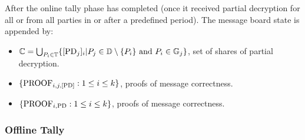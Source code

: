 \documentclass{article}
\begin{document}
After the online tally phase has completed (once it received partial decryption for all \SetOfEncryptedPartialDecryptionKeys{} or from all parties in \SetOfFDKG{} or after a predefined period). The message board state is appended by:
\begin{itemize}
    \item $\mathbb{C} = \bigcup_{P_i \in \mathbb{T}} \{ [\mathrm{PD}_{j}]_{i} | P_{j} \in \mathbb{D} \setminus \{P_{i}\} \text{ and } P_{i} \in \mathbb{G}_{j}\}$, set of shares of partial decryption.
    \item $\{\textrm{PROOF}_{i,j,\textrm{[PD]}} : 1 \leq i \leq k\}$, proofs of message correctness. %
    \item $\{\textrm{PROOF}_{i,\textrm{PD}} : 1 \leq i \leq k\}$, proofs of message correctness. %
\end{itemize}

\subsubsection{Offline Tally}
\end{document}
